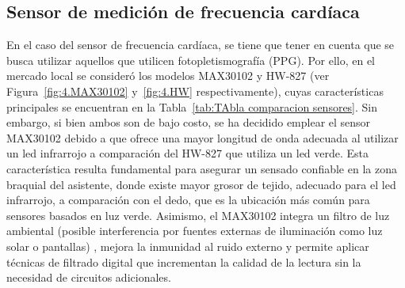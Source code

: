     
\subsection{Sensor de medición de frecuencia cardíaca}
En el caso del sensor de frecuencia cardíaca, se tiene que tener en cuenta que se busca utilizar aquellos que utilicen fotopletismografía (PPG). Por ello, en el mercado local se consideró los modelos MAX30102 y HW-827 (ver Figura~\ref{fig:4.MAX30102} y~\ref{fig:4.HW} respectivamente), cuyas características principales se encuentran en la Tabla~\ref{tab:TAbla comparacion sensores}. Sin embargo, si bien ambos son de bajo costo, se ha decidido emplear el sensor MAX30102 debido a que ofrece una mayor longitud de onda adecuada al utilizar un led infrarrojo a comparación del HW-827 que utiliza un led verde. Esta característica resulta fundamental para asegurar un sensado confiable en la zona braquial del asistente, donde existe mayor grosor de tejido, adecuado para el led infrarrojo, a comparación con el dedo, que es la ubicación más común para sensores basados en luz verde. Asimismo, el MAX30102 integra un filtro de luz ambiental (posible interferencia por fuentes externas de iluminación como luz solar o pantallas) , mejora la inmunidad al ruido externo y permite aplicar técnicas de filtrado digital que incrementan la calidad de la lectura sin la necesidad de circuitos adicionales.\\


